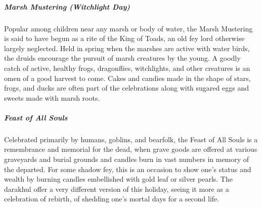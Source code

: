 \documentclass[10pt,a4paper,twoside,bg=print,twocolumn,openany,nodeprecatedcode]{dndbook}
\begin{document}
\subparagraph{Marsh Mustering (Witchlight Day)}
Popular among children near any marsh or body of water, the Marsh Mustering is said to have begun as a rite of the King of Toads, an old fey lord otherwise largely neglected. Held in spring when the marshes are active with water birds, the druids encourage the pursuit of marsh creatures by the young. A goodly catch of active, healthy frogs, dragonflies, witchlights, and other creatures is an omen of a good harvest to come. Cakes and candies made in the shape of stars, frogs, and ducks are often part of the celebrations along with sugared eggs and sweets made with marsh roots.

\subparagraph{Feast of All Souls}
Celebrated primarily by humans, goblins, and bearfolk, the Feast of All Souls is a remembrance and memorial for the dead, when grave goods are offered at various graveyards and burial grounds and candles burn in vast numbers in memory of the departed. For some shadow fey, this is an occasion to show one's status and wealth by burning candles embellished with gold leaf or silver pearls. The darakhul offer a very different version of this holiday, seeing it more as a celebration of rebirth, of shedding one's mortal days for a second life.
\end{document}

